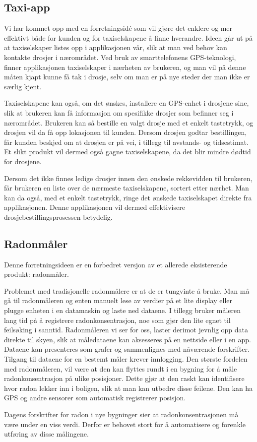 \subsection{Taxi-app}

Vi har kommet opp med en forretningsidé som vil gjøre det enklere og mer effektivt både for kunden og for taxiselskapene å finne hverandre. Ideen går ut på at taxiselskaper listes opp i applikasjonen vår, slik at man ved behov kan kontakte drosjer i nærområdet. Ved bruk av smarttelefonens GPS-teknologi, finner applikasjonen taxiselskaper i nærheten av brukeren, og man vil på denne måten kjapt kunne få tak i drosje, selv om man er på nye steder der man ikke er særlig kjent.

Taxiselskapene kan også, om det ønskes, installere en GPS-enhet i drosjene sine, slik at brukeren kan få informasjon om spesifikke drosjer som befinner seg i nærområdet.
Brukeren kan så bestille en valgt drosje med et enkelt tastetrykk, og drosjen vil da få opp lokasjonen til kunden.
Dersom drosjen godtar bestillingen, får kunden beskjed om at drosjen er på vei, i tillegg til avstands- og tidsestimat.
Et slikt produkt vil dermed også gagne taxiselskapene, da det blir mindre dødtid for drosjene.

Dersom det ikke finnes ledige drosjer innen den ønskede rekkevidden til brukeren, får brukeren en liste over de nærmeste taxiselskapene, sortert etter nærhet. Man kan da også, med et enkelt tastetrykk, ringe det ønskede taxiselskapet direkte fra applikasjonen. Denne applikasjonen vil dermed effektivisere drosjebestillingsprosessen betydelig.


\subsection{Radonmåler}

Denne forretningsideen er en forbedret versjon av et allerede eksisterende produkt: radonmåler.

Problemet med tradisjonelle radonmålere er at de er tungvinte å bruke.
Man må gå til radonmåleren og enten manuelt lese av verdier på et lite display eller plugge enheten i en datamaskin og laste ned dataene.
I tillegg bruker måleren lang tid på å registrere radonkonsentrasjon, noe som gjør den lite egnet til feilsøking i sanntid.
Radonmåleren vi ser for oss, laster derimot jevnlig opp data direkte til skyen, slik at måledataene kan aksesseres på en nettside eller i en app.
Dataene kan presenteres som grafer og sammenlignes med nåværende forskrifter.
Tilgang til dataene for en bestemt måler krever innlogging.
Den største fordelen med radonmåleren, vil være at den kan flyttes rundt i en bygning for å måle radonkonsentrasjon på ulike posisjoner. Dette gjør at den raskt kan identifisere hvor radon lekker inn i boligen, slik at man kan utbedre disse feilene.
Den kan ha GPS og andre sensorer som automatisk registrerer posisjon.

Dagens forskrifter for radon i nye bygninger sier at radonkonsentrasjonen må være under en viss verdi.
Derfor er behovet stort for å automatisere og forenkle utføring av disse målingene.
